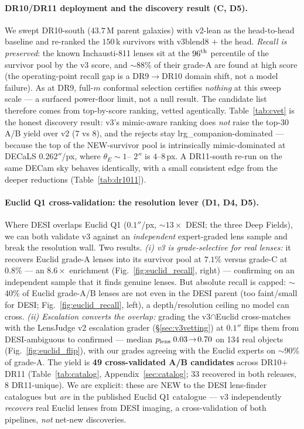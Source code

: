 \paragraph{DR10/DR11 deployment and the discovery result (C, D5).} We swept DR10-south
($43.7$\,M parent galaxies) with v2-lean as the head-to-head baseline and re-ranked the
$150$\,k survivors with v3blend8 $+$ the head. \emph{Recall is preserved}: the known
Inchausti-811 lenses sit at the $96^{\rm th}$ percentile of the survivor pool by the v3 score, and
$\sim$88\% of their grade-A are found at high score (the operating-point recall gap is a
DR9$\to$DR10 domain shift, not a model failure). As at DR9, full-$m$ conformal selection certifies
\emph{nothing} at this sweep scale --- a surfaced power-floor limit, not a null result. The
candidate list therefore comes from top-by-score ranking, vetted agentically. Table~\ref{tab:cvet}
is the honest discovery result: v3's mimic-aware ranking does \emph{not} raise the top-30 A/B yield
over v2 (7 vs 8), and the rejects stay lrg\_companion-dominated --- because the top of the
NEW-survivor pool is intrinsically mimic-dominated at DECaLS $0.262''$/px, where $\theta_E\sim1$--
$2''$ is $4$--$8$\,px. A DR11-south re-run on the same DECam sky behaves identically, with a small
consistent edge from the deeper reductions (Table~\ref{tab:dr1011}).




\paragraph{Euclid Q1 cross-validation: the resolution lever (D1, D4, D5).} Where DESI overlaps
Euclid Q1 \citep{euclidq1} ($0.1''$/px, $\sim$$13\times$ DESI; the three Deep Fields), we can both validate v3 against
an \emph{independent} expert-graded lens sample and break the resolution wall. Two results.
\emph{(i) v3 is grade-selective for real lenses:} it recovers Euclid grade-A lenses into its
survivor pool at $7.1\%$ versus grade-C at $0.8\%$ --- an $8.6\times$ enrichment
(Fig.~\ref{fig:euclid_recall}, right) --- confirming on an independent sample that it finds genuine
lenses. But absolute recall is capped: $\sim$40\% of Euclid grade-A/B lenses are not even in the
DESI parent (too faint/small for DESI; Fig.~\ref{fig:euclid_recall}, left), a depth/resolution
ceiling no model can cross. \emph{(ii) Escalation converts the overlap:} grading the v3$\cap$Euclid
cross-matches with the LensJudge v2 escalation grader (\S\ref{sec:v3vetting}) at $0.1''$ flips them
from DESI-ambiguous to confirmed --- median $p_{\rm lens}\;0.03\!\to\!0.70$ on 134 real objects
(Fig.~\ref{fig:euclid_flip}), with our grades agreeing with the Euclid experts on $\sim$90\% of
grade-A. The yield is \textbf{49 cross-validated A/B candidates} across DR10$+$DR11
(Table~\ref{tab:catalog}, Appendix~\ref{sec:catalog}; $33$ recovered in both releases, $8$
DR11-unique). We are explicit: these are NEW to the DESI lens-finder catalogues but \emph{are} in
the published Euclid Q1 catalogue --- v3 independently \emph{recovers} real Euclid lenses from DESI
imaging, a cross-validation of both pipelines, \emph{not} net-new discoveries.

